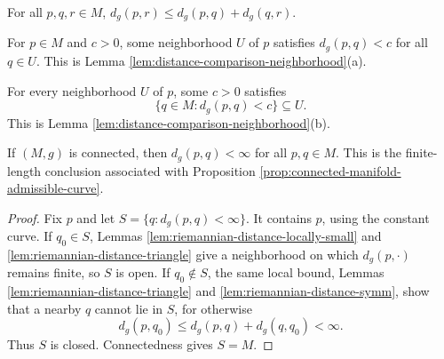 \begin{lemma}
\label{lem:riemannian-distance-triangle}
\mathlibok
{}
For all $p,q,r\in M$, $d_g(p,r)\le d_g(p,q)+d_g(q,r)$.
\end{lemma}

\begin{lemma}
\label{lem:riemannian-distance-locally-small}
\mathlibok
{}
For $p\in M$ and $c>0$, some neighborhood $U$ of $p$ satisfies $d_g(p,q)<c$ for all $q\in U$. This is Lemma \ref{lem:distance-comparison-neighborhood}(a).
\end{lemma}

\begin{lemma}
\label{lem:riemannian-distance-small-implies-nearby}
\mathlibok
{}
For every neighborhood $U$ of $p$, some $c>0$ satisfies
\[
\{q\in M:d_g(p,q)<c\}\subseteq U.
\]
This is Lemma \ref{lem:distance-comparison-neighborhood}(b).
\end{lemma}

\begin{proposition}
\label{prop:riemannian-distance-finite}
\leanok
{}
If $(M,g)$ is connected, then $d_g(p,q)<\infty$ for all $p,q\in M$. This is the finite-length conclusion associated with Proposition \ref{prop:connected-manifold-admissible-curve}.
\end{proposition}
\begin{proof}
\leanok
{}
\sketch Fix $p$ and let $S=\{q:d_g(p,q)<\infty\}$. It contains $p$, using the constant curve. If $q_0\in S$, Lemmas \ref{lem:riemannian-distance-locally-small} and \ref{lem:riemannian-distance-triangle} give a neighborhood on which $d_g(p,\cdot)$ remains finite, so $S$ is open. If $q_0\notin S$, the same local bound, Lemmas \ref{lem:riemannian-distance-triangle} and \ref{lem:riemannian-distance-symm}, show that a nearby $q$ cannot lie in $S$, for otherwise
\[
d_g(p,q_0)\le d_g(p,q)+d_g(q,q_0)<\infty.
\]
Thus $S$ is closed. Connectedness gives $S=M$.
\end{proof}

